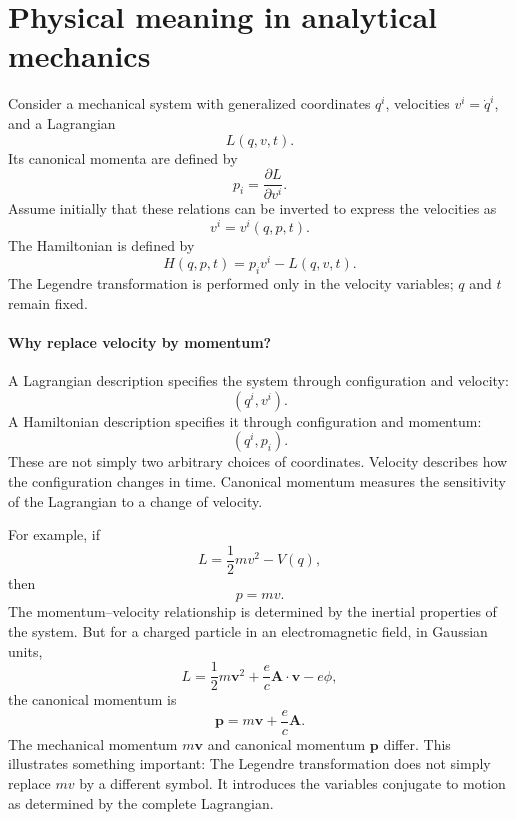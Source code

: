 \section{Physical meaning in analytical mechanics}
Consider a mechanical system with generalized coordinates \(q^i\), velocities
\(v^i=\dot q^i\), and a Lagrangian
\[
L(q,v,t).
\]
Its canonical momenta are defined by
\[
\boxed{p_i=\frac{\partial L}{\partial v^i}.}
\]
Assume initially that these relations can be inverted to express the velocities
as
\[
v^i=v^i(q,p,t).
\]
The Hamiltonian is defined by
\[
\boxed{
H(q,p,t)=p_iv^i-L(q,v,t).
}
\]
The Legendre transformation is performed only in the velocity variables; \(q\)
and \(t\) remain fixed.

\paragraph{Why replace velocity by momentum?}
A Lagrangian description specifies the system through configuration and velocity:
\[
(q^i,v^i).
\]
A Hamiltonian description specifies it through configuration and momentum:
\[
(q^i,p_i).
\]
These are not simply two arbitrary choices of coordinates.
Velocity describes how the configuration changes in time. Canonical momentum
measures the sensitivity of the Lagrangian to a change of velocity.

For example, if
\[
L=\frac12 mv^2-V(q),
\]
then
\[
p=mv.
\]
The momentum–velocity relationship is determined by the inertial properties of
the system.
But for a charged particle in an electromagnetic field, in Gaussian units,
\[
L=\frac12 m\mathbf v^2
+\frac ec\mathbf A\cdot\mathbf v-e\phi,
\]
the canonical momentum is
\[
\boxed{\mathbf p=m\mathbf v+\frac ec\mathbf A.}
\]
The mechanical momentum \(m\mathbf v\) and canonical momentum \(\mathbf p\)
differ.
This illustrates something important:
The Legendre transformation does not simply replace \(mv\) by a different
symbol. It introduces the variables conjugate to motion as determined by the
complete Lagrangian.

